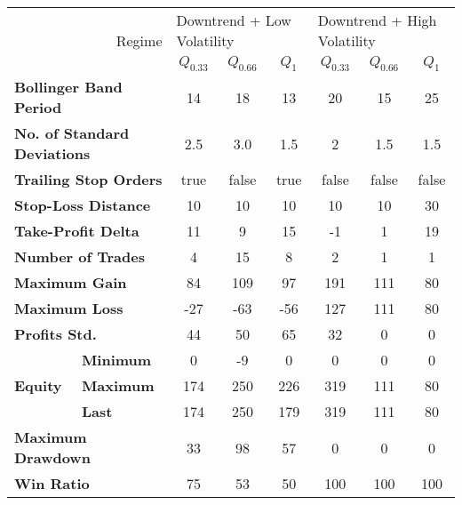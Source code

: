 \centering
\begin{tabular}{ll|cccccc}
    \toprule
    \multicolumn{2}{r|}{\multirow{2}{*}{Regime}} & \multicolumn{3}{l}{Downtrend + Low Volatility}   & \multicolumn{3}{l}{Downtrend + High Volatility}   \\
    \multicolumn{2}{r|}{} & $Q_{0.33}$ & $Q_{0.66}$ & $Q_{1}$ & $Q_{0.33}$ & $Q_{0.66}$ & $Q_{1}$ \\
    \midrule
    \multicolumn{2}{l|}{\textbf{Bollinger Band Period}} & 14 & 18 & 13 & 20 & 15 & 25 \\
    \multicolumn{2}{l|}{\textbf{No. of Standard Deviations}} & 2.5 & 3.0 & 1.5 & 2 & 1.5 & 1.5 \\
    \multicolumn{2}{l|}{\textbf{Trailing Stop Orders}} & true & false & true & false & false & false \\
    \multicolumn{2}{l|}{\textbf{Stop-Loss Distance}} & 10 & 10 & 10 & 10 & 10 & 30 \\
    \multicolumn{2}{l|}{\textbf{Take-Profit Delta}} & 11 & 9 & 15 & -1 & 1 & 19 \\
    \midrule
    \multicolumn{2}{l|}{\textbf{Number of Trades}} & 4 & 15 & 8 & 2 & 1 & 1 \\
    \multicolumn{2}{l|}{\textbf{Maximum Gain}} & 84 & 109 & 97 & 191 & 111 & 80 \\
    \multicolumn{2}{l|}{\textbf{Maximum Loss}} & -27 & -63 & -56 & 127 & 111 & 80 \\
    \multicolumn{2}{l|}{\textbf{Profits Std.}} & 44 & 50 & 65 & 32 & 0 & 0 \\
    \multirow{3}{*}{\textbf{Equity}} & \textbf{Minimum} & 0   & -9  & 0   & 0   & 0   & 0  \\
    & \textbf{Maximum} & 174 & 250 & 226 & 319 & 111 & 80 \\
    & \textbf{Last}    & 174 & 250 & 179 & 319 & 111 & 80 \\
    \multicolumn{2}{l|}{\textbf{Maximum Drawdown}} & 33 & 98 & 57 & 0 & 0 & 0 \\
    \multicolumn{2}{l|}{\textbf{Win Ratio}} & 75 & 53 & 50 & 100 & 100 & 100 \\
    \bottomrule
\end{tabular}
